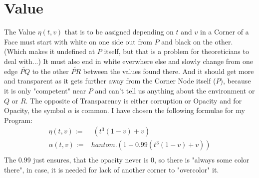 \section{Value}
    The Value $\eta(t, v)$ that is to be assigned depending on $t$ and $v$ in a Corner of a Face must start with white on one side out from $P$ and black on the other. (Which makes it undefined at $P$ itself, but that is a problem for theoreticians to deal with...) It must also end in white everwhere else and slowly change from one edge $\widetilde{PQ}$ to the other $\widetilde{PR}$ between the values found there. And it should get more and transparent as it gets further away from the Corner Node itself ($P$), because it is only "competent" near $P$ and can't tell us anything about the environment or $Q$ or $R$. The opposite of Transparency is either corruption or Opacity and for Opacity, the symbol $\alpha$ is common. I have chosen the following formulae for my Program:
    $$\begin{aligned}
        \eta(t, v) :=&\phantom{.} (t^3(1 - v) + v) \\
        \alpha(t, v) :=&hantom{.} (1 - 0.99(t^3(1 - v) + v)) \\
    \end{aligned}$$
    The 0.99 just ensures, that the opacity never is 0, so there is "always some color there", in case, it is needed for lack of another corner to "overcolor" it.
